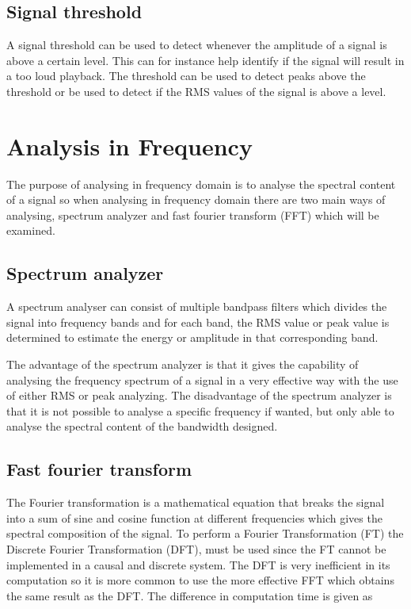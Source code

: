 \subsection*{Signal threshold}
A signal threshold can be used to detect whenever the amplitude of a signal is above a certain level. This can for instance help identify if the signal will result in a too loud playback. The threshold can be used to detect peaks above the threshold or be used to detect if the RMS values of the signal is above a level.

\section{Analysis in Frequency} \label{sec:SignalFreq}
The purpose of analysing in frequency domain is to analyse the spectral content of a signal so when analysing in frequency domain there are two main ways of analysing, spectrum analyzer and fast fourier transform (FFT) which will be examined.

\subsection*{Spectrum analyzer}
A spectrum analyser can consist of multiple bandpass filters which divides the signal into frequency bands and for each band, the RMS value or peak value is determined to estimate the energy or amplitude in that corresponding band. %

The advantage of the spectrum analyzer is that it gives the capability of analysing the frequency spectrum of a signal in a very effective way with the use of either RMS or peak analyzing. The disadvantage of the spectrum analyzer is that it is not possible to analyse a specific frequency if wanted, but only able to analyse the spectral content of the bandwidth designed.      

\subsection*{Fast fourier transform}
The Fourier transformation is a mathematical equation that breaks the signal into a sum of sine and cosine function at different frequencies which gives the spectral composition of the signal. To perform a Fourier Transformation (FT) the Discrete Fourier Transformation (DFT), must be used since the FT cannot be implemented in a causal and discrete system. The DFT is very inefficient in its computation so it is more common to use the more effective FFT which obtains the same result as the DFT. The difference in computation time is given as


